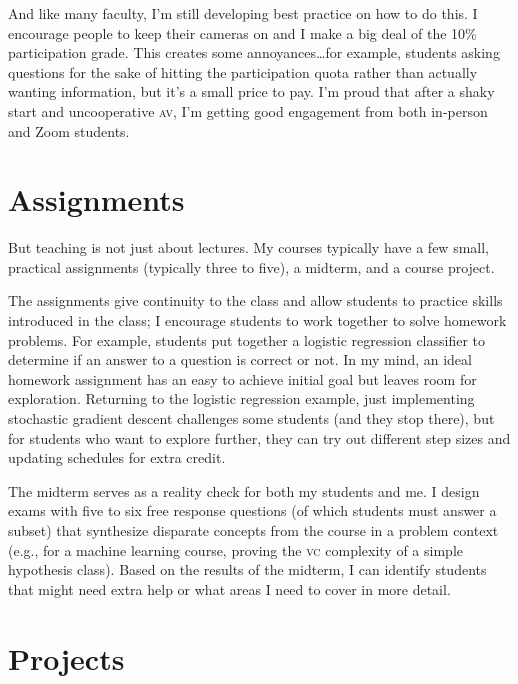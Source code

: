 \documentclass[11pt]{amsart}
\newcommand{\abr}[1]{\textsc{#1}}
\begin{document}
And like many faculty, I'm still developing best practice on how to do
this.  I encourage people to keep their cameras on and I make a big
deal of the 10\% participation grade.  This creates some
annoyances\dots for example, students asking questions for the sake of
hitting the participation quota rather than actually wanting
information, but it's a small price to pay.  I'm proud that after a
shaky start and uncooperative \abr{av}, I'm getting good engagement
from both in-person and Zoom students.

\section{Assignments}

But teaching is not just about lectures.  My courses typically have a
few small, practical assignments (typically three to five), a midterm,
and a course project.

The assignments give continuity to the class and allow students to
practice skills introduced in the class; I encourage students to work
together to solve homework problems.
%
For example, students put together a logistic regression classifier to
determine if an answer to a question is correct or not.  In my mind,
an ideal homework assignment has an easy to achieve initial goal but
leaves room for exploration.  Returning to the logistic regression
example, just implementing stochastic gradient descent challenges some
students (and they stop there), but for students who want to explore
further, they can try out different step sizes and updating schedules
for extra credit.

The midterm serves as a reality check for both my students and me.  I
design exams with five to six free response questions (of which
students must answer a subset) that synthesize disparate concepts from
the course in a problem context (e.g., for a machine learning course,
proving the \abr{vc} complexity of a simple hypothesis class).  Based
on the results of the midterm, I can identify students that might need
extra help or what areas I need to cover in more detail.

\section{Projects}
\end{document}
